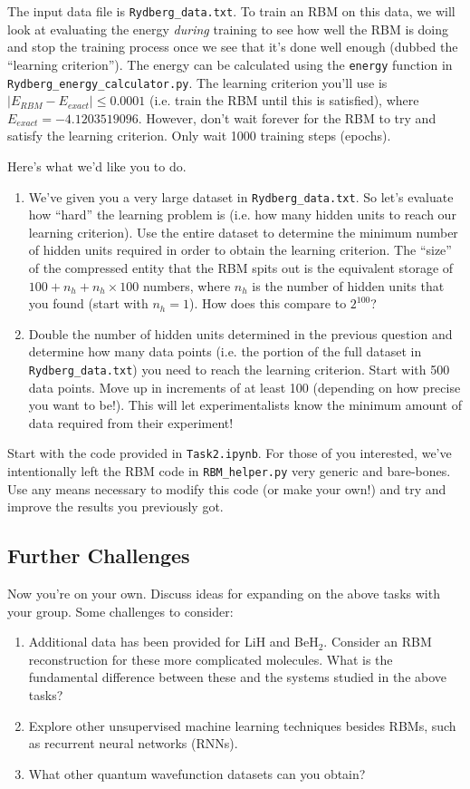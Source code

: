 \documentclass[12pt]{article}
\begin{document}
The input data file is \texttt{Rydberg\_data.txt}. To train an RBM on this data, we will look at evaluating the energy \textit{during} training to see how well the RBM is doing and stop the training process once we see that it's done well enough (dubbed the ``learning criterion''). The energy can be calculated using the \texttt{energy} function in \texttt{Rydberg\_energy\_calculator.py}. The learning criterion you'll use is $\vert E_{RBM} - E_{exact} \vert \leq 0.0001$ (i.e. train the RBM until this is satisfied), where $E_{exact} = -4.1203519096$. However, don't wait forever for the RBM to try and satisfy the learning criterion. Only wait 1000 training steps (epochs).

Here's what we'd like you to do.
\begin{enumerate}
    \item We've given you a very large dataset in \texttt{Rydberg\_data.txt}. So let's evaluate how ``hard'' the learning problem is (i.e. how many hidden units to reach our learning criterion). Use the entire dataset to determine the minimum number of hidden units required in order to obtain the learning criterion. The ``size'' of the compressed entity that the RBM spits out is the equivalent storage of $100 + n_h + n_h \times 100$ numbers, where $n_h$ is the number of hidden units that you found (start with $n_h = 1$). How does this compare to $2^{100}$? 
    \item Double the number of hidden units determined in the previous question and determine how many data points (i.e. the portion of the full dataset in \texttt{Rydberg\_data.txt}) you need to reach the learning criterion. Start with 500 data points. Move up in increments of at least 100 (depending on how precise you want to be!). This will let experimentalists know the minimum amount of data required from their experiment!
\end{enumerate}

Start with the code provided in \texttt{Task2.ipynb}. For those of you interested, we've intentionally left the RBM code in \texttt{RBM\_helper.py} very generic and bare-bones. Use any means necessary to modify this code (or make your own!) and try and improve the results you previously got.

\subsection*{Further Challenges} \label{sec:challenges}

Now you're on your own.  Discuss ideas for expanding on the above tasks with your group.  Some challenges to consider:
\begin{enumerate}
\item Additional data has been provided for LiH and BeH$_2$. Consider an RBM reconstruction for these more complicated molecules.  What is the fundamental difference between these and the systems studied in the above tasks?
\item Explore other unsupervised machine learning techniques besides RBMs, such as recurrent neural networks (RNNs).
\item What other quantum wavefunction datasets can you obtain?
\end{enumerate}
\end{document}
